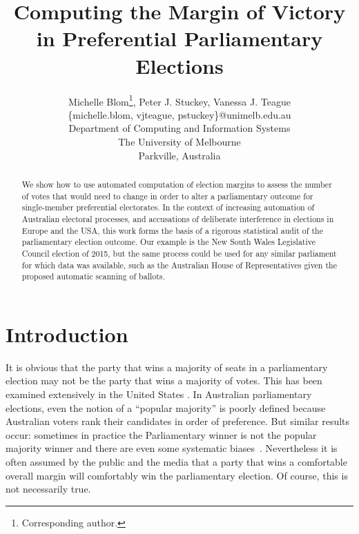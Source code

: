 \documentclass{article}
\begin{document}
\newcommand{\cand}{\mathcal{C}}
\newcommand{\altcand}{\mathcal{A}}
\newcommand{\gone}{\mathcal{E}}
\newcommand{\stand}{\mathcal{S}}
\newcommand{\election}{\mathcal{B}}
\newcommand{\voters}{V}

\newcommand{\plusplus}{+\!\!+}
\newcommand{\mss}{\{\!\!\{}
\newcommand{\mse}{\}\!\!\}}


\title{Computing the Margin of Victory in Preferential Parliamentary Elections}
\author{Michelle Blom\footnote{Corresponding author.}, Peter J. Stuckey, Vanessa J. Teague \\
\{michelle.blom, vjteague, pstuckey\}@unimelb.edu.au \\
\doublespacing Department of Computing and Information Systems \\The University of Melbourne\\ Parkville, Australia}

\date{}
\maketitle

\begin{abstract}
We show how to use automated computation of election margins to assess the number of votes that would need to change in order to alter a parliamentary outcome for single-member preferential electorates.  In the context of increasing automation of Australian electoral processes, and accusations of deliberate interference in elections in Europe and the USA, this work forms the basis of a rigorous statistical audit of the parliamentary election outcome.  Our example is the New South Wales Legislative Council election of 2015, but the same process could be used for any similar parliament for which data was available, such as the Australian House of Representatives given the proposed automatic scanning of ballots.
\end{abstract}


\section{Introduction}\label{sec:Intro}
It is obvious that the party that wins a majority of seats in a parliamentary election may not be the party that wins a majority of votes.  This has been examined extensively in the United States \citep{tufte1973relationship, yang2008democracy}.  In Australian parliamentary elections, even the notion of a “popular majority” is poorly defined because Australian voters rank their candidates in order of preference.  But similar results occur: sometimes in practice the Parliamentary winner is not the popular majority winner and there are even some systematic biases~\citep{jackman1994measuring}.  Nevertheless it is often assumed by the public and the media that a party that wins a comfortable overall margin will comfortably win the parliamentary election.  Of course, this is not necessarily true.  %
\end{document}
